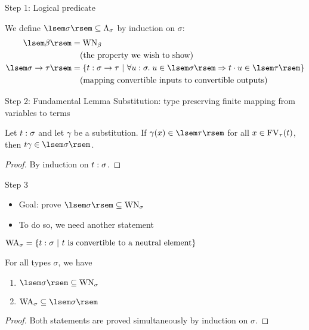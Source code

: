 \documentclass{beamer}
\begin{document}
\begin{frame}{Step 1: Logical predicate}
\begin{defn}
We define $\sem{\sigma} \subs \Tm[\sigma]$ by induction on $\sigma$:
\begin{align*}
\sem{\beta} &= \mathrm{WN}_\beta \\
            &\quad\text{(the property we wish to show)} \\
\sem{\functy{\sigma}{\tau}} &= \setof{\typedtm{t}{\functy{\sigma}{\tau}}}{\forall \typedtm{u}{\sigma}.\;u \in \sem{\sigma} \implies \app{t}{u} \in \sem{\tau}} \\
            &\quad\text{(mapping convertible inputs to convertible outputs)}
\end{align*}
\end{defn}
\end{frame}

\begin{frame}{Step 2: Fundamental Lemma}
Substitution: type preserving finite mapping from variables to terms
\begin{lem}
Let $\typedtm{t}{\sigma}$ and let $\gamma$ be a substitution. If $\gamma(x) \in \sem{\tau}$ for all $x \in \FV[\tau]{t}$, then $\subst{t}{\gamma} \in \sem{\sigma}$.
\end{lem}
\begin{proof}
By induction on $\typedtm{t}{\sigma}$.
\end{proof}
\end{frame}

\begin{frame}{Step 3}
\begin{itemize}
    \item Goal: prove $\sem{\sigma} \subs \mathrm{WN}_\sigma$
    \item To do so, we need another statement
\end{itemize}
$\mathrm{WA}_\sigma = \setof{\typedtm{t}{\sigma}}{t\text{ is convertible to a neutral element}}$
\begin{lem}
For all types $\sigma$, we have
\begin{enumerate}
    \item $\sem{\sigma} \subs \mathrm{WN}_\sigma$
    \item $\mathrm{WA}_\sigma \subs \sem{\sigma}$
\end{enumerate}
\end{lem}
\begin{proof}
Both statements are proved simultaneously by induction on $\sigma$.
\end{proof}
\end{frame}
\end{document}
